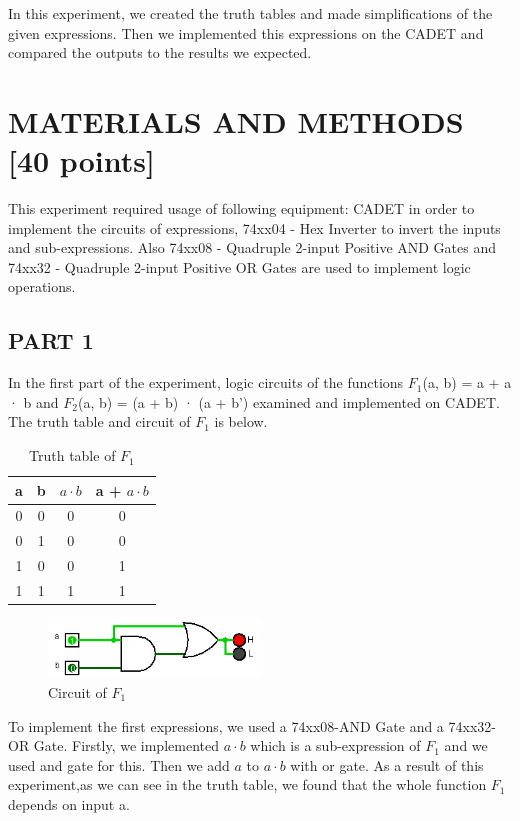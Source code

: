 \documentclass[pdftex,12pt,a4paper]{article}
\begin{document}
In this experiment, we created the truth tables and made simplifications of the given expressions. Then we implemented this expressions on the CADET and compared the outputs to the results we expected.  

\section{MATERIALS AND METHODS [40 points]}
This experiment required usage of following equipment: CADET in order to implement the circuits of expressions, 74xx04 - Hex Inverter to invert the inputs and sub-expressions. Also 74xx08 - Quadruple 2-input Positive AND Gates and 74xx32 - Quadruple 2-input Positive OR Gates are used to implement logic operations.

\subsection{PART 1}
In the first part of the experiment, logic circuits of the functions $F_1$(a, b) = a + a · b and $F_2$(a, b) = (a + b) · (a + b') examined and implemented on CADET. \\

The truth table and circuit of $F_1$ is below. 

\begin{table}[h]
    \centering
    \begin{tabular}{|c|c|c|c|}
    \hline
    a & b & $a \cdot b$ & a + $a \cdot b$ \\ \hline
    0 & 0 &       0     & 0         \\
    0 & 1 &       0     & 0         \\
    1 & 0 &       0     & 1         \\
    1 & 1 &       1     & 1         \\ \hline
    \end{tabular}
    \caption{Truth table of $F_1$}
    \label{fig1}
\end{table}

\begin{figure}[ht]
	\centering
	\includegraphics[width=0.5\textwidth]{2_1.png}	
	\caption{Circuit of $F_1$}
	\label{fig1}
\end{figure}

To implement the first expressions, we used a 74xx08-AND Gate and a 74xx32-OR Gate. Firstly, we implemented $a \cdot b$ which is a sub-expression of $F_1$ and we used and gate for this. Then we add  $a$ to $a \cdot b$ with or gate. As a result of this experiment,as we can see in the truth table, we found that the whole function $F_1$ depends on input a.
\end{document}
